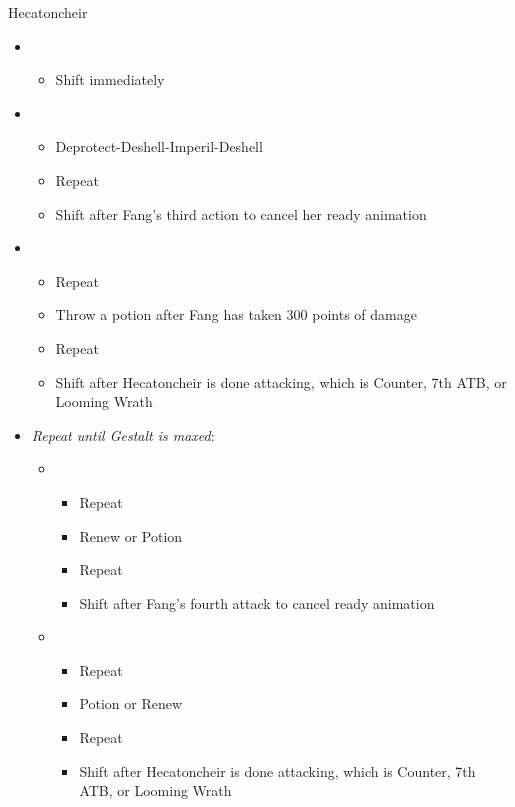 \begin{battle}[1:40]{Hecatoncheir}
		\begin{itemize}
			\item \first
			      \begin{itemize}
				      \item Shift immediately
			      \end{itemize}
			\item \third
			      \begin{itemize}
				      \item Deprotect-Deshell-Imperil-Deshell
				      \item Repeat
				      \item Shift after Fang's third action to cancel her ready animation
			      \end{itemize}
			\item \fourth
			      \begin{itemize}
				      \item Repeat
				      \item Throw a potion after Fang has taken 300 points of damage
				      \item Repeat
				      \item Shift after Hecatoncheir is done attacking, which is Counter, 7th ATB, or Looming Wrath
			      \end{itemize}
			      \columnbreak
			\item \textit{Repeat until Gestalt is maxed}:
			      \begin{itemize}
				      \item \third
				            \begin{itemize}
					            \item Repeat
					            \item Renew or Potion
					            \item Repeat
					            \item Shift after Fang's fourth attack to cancel ready animation
				            \end{itemize}
				      \item \fourth
				            \begin{itemize}
					            \item Repeat
					            \item Potion or Renew
					            \item Repeat
					            \item Shift after Hecatoncheir is done attacking, which is Counter, 7th ATB, or Looming Wrath
				            \end{itemize}
			      \end{itemize}
		\end{itemize}
\end{battle}

